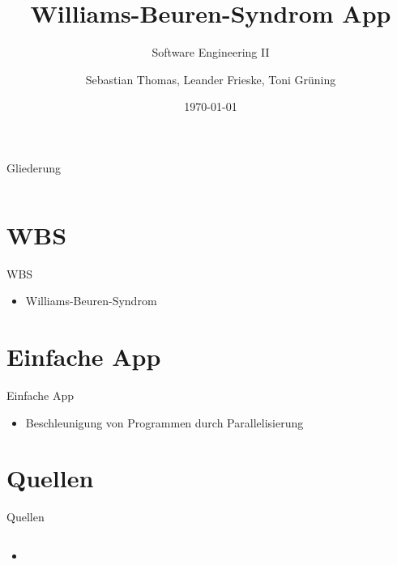 \documentclass[10pt,fleqn]{beamer}
\title[WBS]{Williams-Beuren-Syndrom App}
\subtitle[]{Software Engineering II}
\date{\today}
\author{Sebastian Thomas, Leander Frieske, Toni Grüning}
\begin{document}

\begin{frame}
	\titlepage
\end{frame}

\begin{frame}{Gliederung}
 	\begin{columns}
   		\begin{column}{6.0cm}
		    \renewcommand{\baselinestretch}{1.5}
		    \normalsize
		    \tableofcontents
		    \renewcommand{\baselinestretch}{1.0}
		    \normalsize
	   	\end{column}
	   	\hspace*{-1.3cm}
	\end{columns}
\end{frame}

\section{WBS}
\begin{frame}[t]{WBS}
	\begin{itemize}
		\item Williams-Beuren-Syndrom
	\end{itemize}
\end{frame}


\section{Einfache App}
\begin{frame}[t]{Einfache App}
\begin{itemize}
	\item Beschleunigung von Programmen durch Parallelisierung
\end{itemize}
\end{frame}



\section{Quellen}
\begin{frame}{Quellen}
	\begin{columns}
		\begin{column}{16cm}	
			\begin{itemize}
				\item 
			\end{itemize}
		\end{column}
	\end{columns}
\end{frame}
\end{document}
